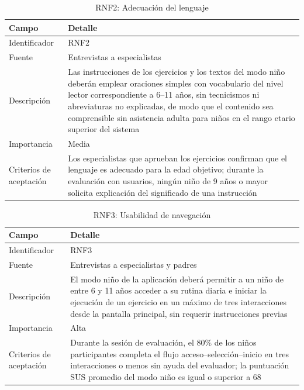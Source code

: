 					\begin{table}[H]
						\centering\small
						\caption{RNF2: Adecuación del lenguaje}
						\label{tab:rnf2}
						\begin{tabular}{p{3.5cm}p{11cm}}
							\hline
							\textbf{Campo} & \textbf{Detalle} \\
							\hline
							Identificador & RNF2 \\
							
							Fuente & Entrevistas a especialistas \\
							
							Descripción & Las instrucciones de los ejercicios y los textos del modo niño deberán emplear oraciones simples con vocabulario del nivel lector correspondiente a 6--11 años, sin tecnicismos ni abreviaturas no explicadas, de modo que el contenido sea comprensible sin asistencia adulta para niños en el rango etario superior del sistema \\
							
							Importancia & Media \\
							
							Criterios de aceptación & Los especialistas que aprueban los ejercicios confirman que el lenguaje es adecuado para la edad objetivo; durante la evaluación con usuarios, ningún niño de 9 años o mayor solicita explicación del significado de una instrucción \\
							\hline
						\end{tabular}
					\end{table} \tblnote
					
					\begin{table}[H]
						\centering\small
						\caption{RNF3: Usabilidad de navegación}
						\label{tab:rnf3}
						\begin{tabular}{p{3.5cm}p{11cm}}
							\hline
							\textbf{Campo} & \textbf{Detalle} \\
							\hline
							Identificador & RNF3 \\
							
							Fuente & Entrevistas a especialistas y padres \\
							
							Descripción & El modo niño de la aplicación deberá permitir a un niño de entre 6 y 11 años acceder a su rutina diaria e iniciar la ejecución de un ejercicio en un máximo de tres interacciones desde la pantalla principal, sin requerir instrucciones previas \\
							
							Importancia & Alta \\
							
							Criterios de aceptación & Durante la sesión de evaluación, el 80\% de los niños participantes completa el flujo acceso--selección--inicio en tres interacciones o menos sin ayuda del evaluador; la puntuación SUS promedio del modo niño es igual o superior a 68~\cite{Bangor2009} \\
							\hline
						\end{tabular}
					\end{table} \tblnote
					
